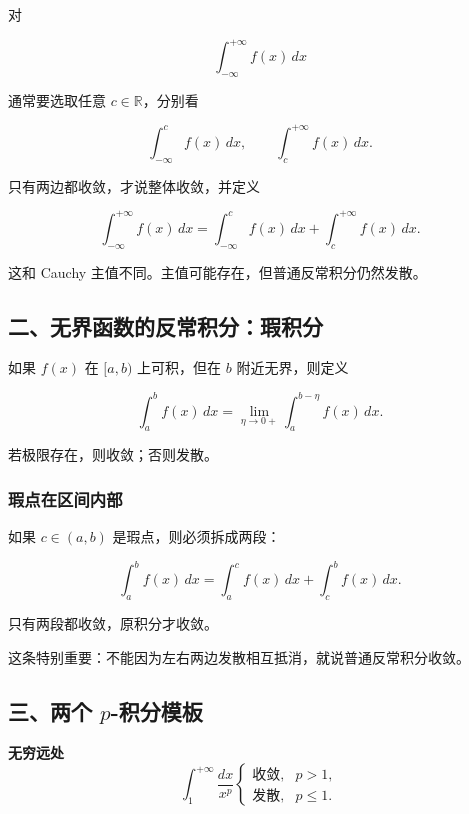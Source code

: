 对

\[
      \int_{-\infty}^{+\infty}f(x)\,dx
    \]

通常要选取任意 \(c\in\mathbb R\)，分别看

\[
      \int_{-\infty}^{c}f(x)\,dx,\qquad
      \int_{c}^{+\infty}f(x)\,dx.
    \]

只有两边都收敛，才说整体收敛，并定义

\[
      \int_{-\infty}^{+\infty}f(x)\,dx
      =
      \int_{-\infty}^{c}f(x)\,dx+
      \int_{c}^{+\infty}f(x)\,dx.
    \]

\begin{notebox}
这和 Cauchy 主值不同。主值可能存在，但普通反常积分仍然发散。
\end{notebox}

\subsection*{二、无界函数的反常积分：瑕积分}

如果 \(f(x)\) 在 \([a,b)\) 上可积，但在 \(b\) 附近无界，则定义

\[
      \int_a^b f(x)\,dx
      =
      \lim_{\eta\to0+}\int_a^{b-\eta}f(x)\,dx.
    \]

若极限存在，则收敛；否则发散。

\subsubsection*{瑕点在区间内部}

如果 \(c\in(a,b)\) 是瑕点，则必须拆成两段：

\[
      \int_a^b f(x)\,dx
      =
      \int_a^c f(x)\,dx+
      \int_c^b f(x)\,dx.
    \]

只有两段都收敛，原积分才收敛。

\begin{notebox}
这条特别重要：不能因为左右两边发散相互抵消，就说普通反常积分收敛。
\end{notebox}

\subsection*{三、两个 \(p\)-积分模板}

\begin{conceptbox}
\textbf{无穷远处}
\[
          \int_1^{+\infty}\frac{dx}{x^p}
          \begin{cases}
          \text{收敛},&p>1,\\
          \text{发散},&p\le1.
          \end{cases}
        \]
\end{conceptbox}

